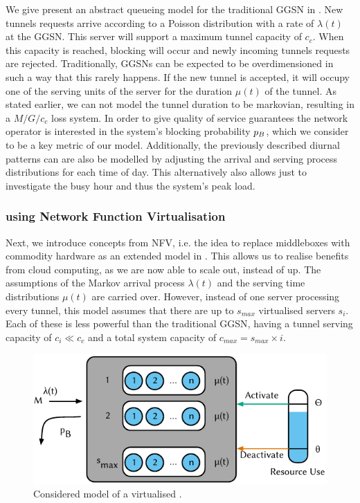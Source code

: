 We give present an abstract queueing model for the traditional \gls{GGSN} in .
New tunnels requests arrive according to a Poisson distribution with a rate of \(\lambda(t)\) at the \gls{GGSN}.
This server will support a maximum tunnel capacity of \(c_c\).
When this capacity is reached, blocking will occur and newly incoming tunnels requests are rejected.
Traditionally, \glspl{GGSN} can be expected to be overdimensioned in such a way that this rarely happens.
If the new tunnel is accepted, it will occupy one of the serving units of the server for the duration \(\mu(t)\) of the tunnel.
As stated earlier, we can not model the tunnel duration to be markovian, resulting in a  \(M/G/c_c\) loss system.
In order to give quality of service guarantees the network operator is interested in the system's blocking probability \(p_B\), which we consider to be a key metric of our model.
Additionally, the previously described diurnal patterns can are also be modelled by adjusting the arrival and serving process distributions for each time of day.
This alternatively also allows just to investigate the busy hour and thus the system's peak load.

\subsubsection*{ using Network Function Virtualisation}\label{sec:cloud:virtualized_network_functions:model:virtual_ggsn}
Next, we introduce concepts from \gls{NFV}, i.e. the idea to replace middleboxes with commodity hardware as an extended model in . 
This allows us to realise benefits from cloud computing, as we are now able to scale out, instead of up.
The assumptions of the Markov arrival process \(\lambda(t)\) and the serving time distributions \(\mu(t)\) are carried over.
However, instead of one server processing every tunnel, this model assumes that there are up to \(s_{max}\) virtualised servers \(s_i\).
Each of these is less powerful than the traditional \gls{GGSN}, having a tunnel serving capacity of \(c_i \ll c_c\) and a total system capacity of \(c_{max} = s_{max} \times i\).

\begin{figure}
  \centering
  \includegraphics{cloud/virtualized_network_functions/model/figures/virtual_ggsn}
  \caption{Considered model of a virtualised .}
  \label{sec:cloud:virtualized_network_functions:model:virtual_ggsn:model}
\end{figure} 

